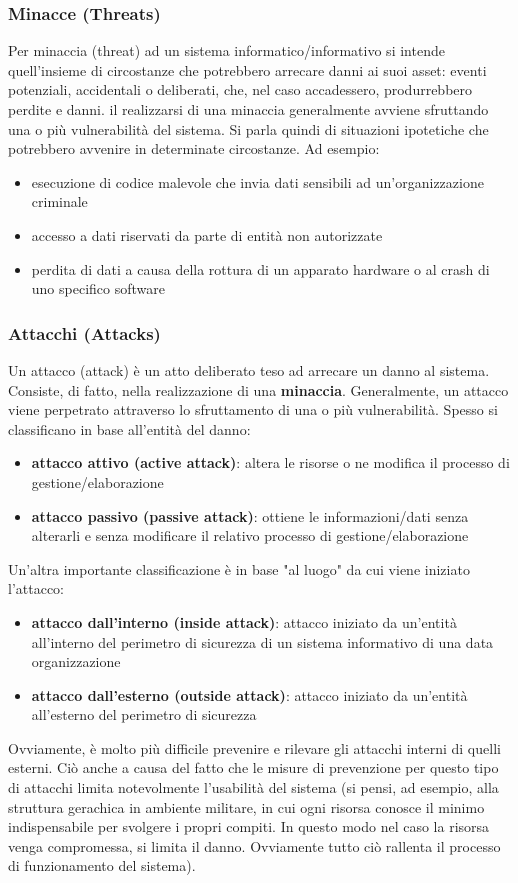 \subsubsection{Minacce (Threats)}
Per minaccia (threat) ad un sistema informatico/informativo si intende quell’insieme di circostanze che potrebbero arrecare danni ai suoi asset: eventi potenziali, accidentali o deliberati, che, nel caso accadessero, produrrebbero perdite e danni. il realizzarsi di una minaccia generalmente avviene sfruttando una o più vulnerabilità del sistema.  Si parla quindi di situazioni ipotetiche che potrebbero avvenire in determinate circostanze. Ad esempio:
\begin{itemize} 
  \item esecuzione di codice malevole che invia dati sensibili ad un'organizzazione criminale
  \item accesso a dati riservati da parte di entità non autorizzate
  \item perdita di dati a causa della rottura di un apparato hardware o al crash di uno specifico software
\end{itemize}

\subsubsection{Attacchi (Attacks)}
Un attacco (attack) è un atto deliberato teso ad arrecare un danno al sistema. Consiste, di fatto, nella realizzazione di una \textbf{minaccia}. Generalmente, un attacco viene perpetrato attraverso lo sfruttamento di una o più vulnerabilità. Spesso si classificano in base all’entità del danno:
\begin{itemize} 
  \item \textbf{attacco attivo (active attack)}: altera le risorse o ne modifica il processo di gestione/elaborazione
  \item \textbf{attacco passivo (passive attack)}: ottiene le informazioni/dati senza alterarli e senza modificare il relativo processo di
gestione/elaborazione
\end{itemize}
Un’altra importante classificazione è in base "al luogo" da cui viene iniziato l’attacco:
\begin{itemize} 
  \item \textbf{attacco dall’interno (inside attack)}: attacco iniziato da un'entità all’interno del perimetro di sicurezza di un sistema informativo di una data organizzazione
  \item \textbf{attacco dall’esterno (outside attack)}: attacco iniziato da un'entità all’esterno del perimetro di sicurezza
\end{itemize}
Ovviamente, è molto più difficile prevenire e rilevare gli attacchi interni di quelli esterni. Ciò anche a causa del fatto che le misure di prevenzione per questo tipo di attacchi limita notevolmente l'usabilità del sistema (si pensi, ad esempio, alla struttura gerachica in ambiente militare, in cui ogni risorsa conosce il minimo indispensabile per svolgere i propri compiti. In questo modo nel caso la risorsa venga compromessa, si limita il danno. Ovviamente tutto ciò rallenta il processo di funzionamento del sistema).

